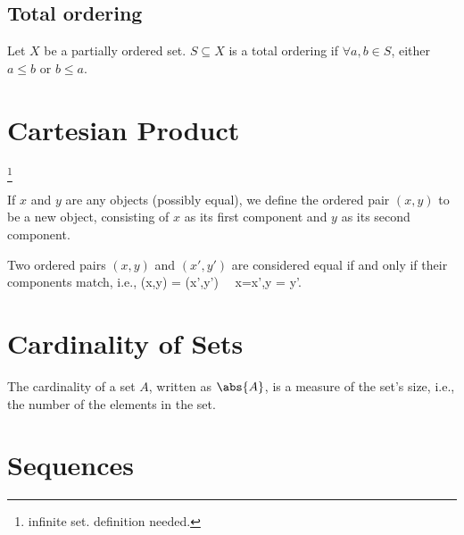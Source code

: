 \subsection{Total ordering}

\begin{definition}\label{def:total ordering}
Let $X$ be a partially ordered set. $S \subseteq X$ is a total ordering if $\forall a,b\in S$, either $a\leq b$ or $b\leq a$.
\end{definition}


\section{Cartesian Product}

\footnote{infinite set. definition needed.}

\begin{definition}
If $x$ and $y$ are any objects (possibly equal), we define the ordered pair $(x,y)$ to be a new object, consisting of $x$ as its first component and $y$ as its second component.
\end{definition}

\begin{definition}
Two ordered pairs $(x,y)$ and $(x',y')$ are considered equal if and only if their components match, i.e., \be (x,y) = (x',y') \ \lra \ x=x',y = y'. \ee
\end{definition}

\section{Cardinality of Sets}


\begin{definition}[cardinality]
The cardinality of a set $A$, written as $\abs{A}$, is a measure of the set's size, i.e., the number of the elements in the set.
\end{definition}






\section{Sequences}

